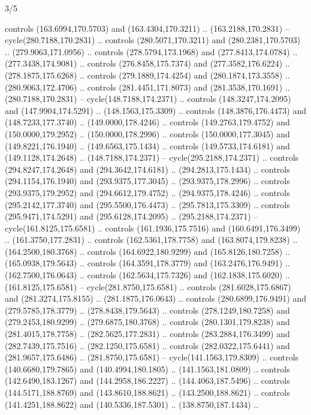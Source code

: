 \begin{flagdescription}{3/5}
\begin{scope}[scale=0.00214\flagwidth,yshift=162mm]
\begin{scope}[y=-0.8pt, x=0.8pt, inner sep=0pt, outer sep=0pt]
\begin{scope}[draw,fill=gold,line join=round,line cap=round,line width=0.0025\flagwidth]
\begin{scope}[line width=0.0025\flagwidth]
controls (163.6994,170.5703) and (163.4304,170.3211) .. (163.2188,170.2831) --
cycle(280.7188,170.2831) .. controls (280.5071,170.3211) and
(280.2381,170.5703) .. (279.9063,171.0956) .. controls (278.5794,173.1968) and
(277.8413,174.0784) .. (277.3438,174.9081) .. controls (276.8458,175.7374) and
(277.3582,176.6224) .. (278.1875,175.6268) .. controls (279.1889,174.4254) and
(280.1874,173.3558) .. (280.9063,172.4706) .. controls (281.4451,171.8073) and
(281.3538,170.1691) .. (280.7188,170.2831) -- cycle(148.7188,174.2371) ..
controls (148.3247,174.2095) and (147.9904,174.5291) .. (148.1563,175.3309) ..
controls (148.3876,176.4473) and (148.7233,177.3740) .. (149.0000,178.4246) ..
controls (149.2763,179.4752) and (150.0000,179.2952) .. (150.0000,178.2996) ..
controls (150.0000,177.3045) and (149.8221,176.1940) .. (149.6563,175.1434) ..
controls (149.5733,174.6181) and (149.1128,174.2648) .. (148.7188,174.2371) --
cycle(295.2188,174.2371) .. controls (294.8247,174.2648) and
(294.3642,174.6181) .. (294.2813,175.1434) .. controls (294.1154,176.1940) and
(293.9375,177.3045) .. (293.9375,178.2996) .. controls (293.9375,179.2952) and
(294.6612,179.4752) .. (294.9375,178.4246) .. controls (295.2142,177.3740) and
(295.5500,176.4473) .. (295.7813,175.3309) .. controls (295.9471,174.5291) and
(295.6128,174.2095) .. (295.2188,174.2371) -- cycle(161.8125,175.6581) ..
controls (161.1936,175.7516) and (160.6491,176.3499) .. (161.3750,177.2831) ..
controls (162.5361,178.7758) and (163.8074,179.8238) .. (164.2500,180.3768) ..
controls (164.6922,180.9299) and (165.8126,180.7258) .. (165.0938,179.5643) ..
controls (164.3591,178.3779) and (163.2476,176.9491) .. (162.7500,176.0643) ..
controls (162.5634,175.7326) and (162.1838,175.6020) .. (161.8125,175.6581) --
cycle(281.8750,175.6581) .. controls (281.6028,175.6867) and
(281.3274,175.8155) .. (281.1875,176.0643) .. controls (280.6899,176.9491) and
(279.5785,178.3779) .. (278.8438,179.5643) .. controls (278.1249,180.7258) and
(279.2453,180.9299) .. (279.6875,180.3768) .. controls (280.1301,179.8238) and
(281.4015,178.7758) .. (282.5625,177.2831) .. controls (283.2884,176.3499) and
(282.7439,175.7516) .. (282.1250,175.6581) .. controls (282.0322,175.6441) and
(281.9657,175.6486) .. (281.8750,175.6581) -- cycle(141.1563,179.8309) ..
controls (140.6680,179.7865) and (140.4994,180.1805) .. (141.1563,181.0809) ..
controls (142.6490,183.1267) and (144.2958,186.2227) .. (144.4063,187.5496) ..
controls (144.5171,188.8769) and (143.8610,188.8621) .. (143.2500,188.8621) ..
controls (141.4251,188.8622) and (140.5336,187.5301) .. (138.8750,187.1434) ..

\end{scope}
\end{scope}
\end{scope}
\end{scope}
\end{flagdescription}
